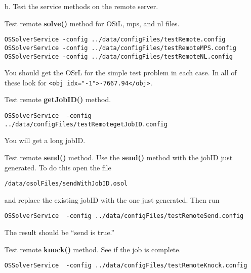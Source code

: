 {\begin{itemize}
\begin{itemize}
You should get the OSrL for the simple test problem.   In all of these look for {\tt <obj idx="-1">-7667.94</obj>} in the MPS test and {\tt <obj idx="-1">-7667.94</obj>} in the other two.


\item[b.]  Test the service methods on the remote server.  


 Test remote {\bf solve()} method for OSiL, mps, and nl files.



\begin{verbatim}
OSSolverService -config ../data/configFiles/testRemote.config
OSSolverService -config ../data/configFiles/testRemoteMPS.config
OSSolverService -config ../data/configFiles/testRemoteNL.config
\end{verbatim}


You should get the OSrL for the simple test problem in each case.  In all of these look for {\tt <obj idx="-1">-7667.94</obj>}.

\vskip 10pt


 Test remote {\bf getJobID()} method.


\begin{verbatim}
OSSolverService  -config ../data/configFiles/testRemotegetJobID.config
\end{verbatim}



You will get a long jobID.


\vskip 10pt


 Test remote {\bf send()} method. Use the {\bf send()} method with the jobID just  generated.  To do this open the file
\begin{verbatim}
/data/osolFiles/sendWithJobID.osol
\end{verbatim}
and replace the existing jobID with the one just generated.  Then run
\begin{verbatim}
OSSolverService  -config ../data/configFiles/testRemoteSend.config
\end{verbatim}
The result should be ``send is true.''

\vskip 10pt

 Test remote {\bf knock()} method.  See if the  job is complete.


\begin{verbatim}
OSSolverService  -config ../data/configFiles/testRemoteKnock.config
\end{verbatim}


\end{itemize}
\end{itemize}}
